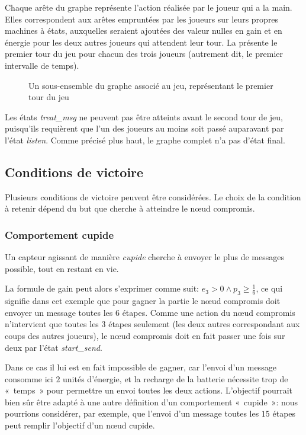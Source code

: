 Chaque arête du graphe représente l'action réalisée par le joueur qui a la main.
Elles correspondent aux arêtes empruntées par les joueurs sur leurs propres machines à états, auxquelles seraient ajoutées des valeur nulles en gain et en énergie pour les deux autres joueurs qui attendent leur tour.
La  présente le premier tour du jeu pour chacun des trois joueurs (autrement dit, le premier intervalle de temps).
\begin{figure}[p]
    \centering
    
    \caption{Un sous-ensemble du graphe associé au jeu, représentant le premier tour du jeu}\label{tj:fig:autFirstTurn}
\end{figure}
Les états \emph{treat\_msg} ne peuvent pas être atteints avant le second tour de jeu, puisqu'ils requièrent que l'un des joueurs au moins soit passé auparavant par l'état \emph{listen}.
Comme précisé plus haut, le graphe complet n'a pas d'état final.

    \subsection{Conditions de victoire}

Plusieurs conditions de victoire peuvent être considérées.
Le choix de la condition à retenir dépend du but que cherche à atteindre le nœud compromis.

        \subsubsection{Comportement cupide}
Un capteur agissant de manière \emph{cupide} cherche à envoyer le plus de messages possible, tout en restant en vie.

La formule de gain peut alors s'exprimer comme suit: $e_3 > 0 \wedge p_3 \geq \frac16$, ce qui signifie dans cet exemple que pour gagner la partie le nœud compromis doit envoyer un message toutes les $6$ étapes.
Comme une action du nœud compromis n'intervient que toutes les $3$ étapes seulement (les deux autres correspondant aux coups des autres joueurs), le nœud compromis doit en fait passer une fois sur deux par l'état \emph{start\_send}.

Dans ce cas il lui est en fait impossible de gagner, car l'envoi d'un message consomme ici $2$ unités d'énergie, et la recharge de la batterie nécessite trop de « temps » pour permettre un envoi toutes les deux actions.
L'objectif pourrait bien sûr être adapté à une autre définition d'un comportement « cupide »: nous pourrions considérer, par exemple, que l'envoi d'un message toutes les $15$ étapes peut remplir l'objectif d'un nœud cupide.

